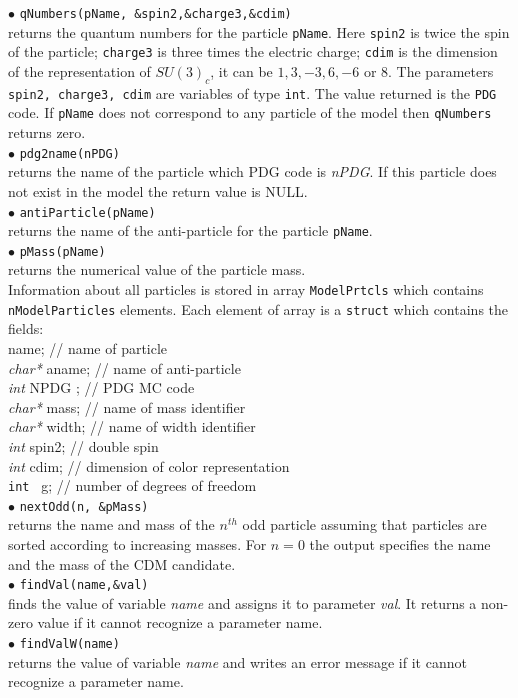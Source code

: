 \documentclass[12pt,a4paper]{article}
\begin{document}
%
\noindent 
$\bullet$ \verb|qNumbers(pName, &spin2,&charge3,&cdim)|\\
returns the quantum numbers for the particle \verb|pName|. Here \verb|spin2| is twice the spin of the particle; \verb|charge3| is 
three times the electric charge; \verb|cdim| is the  dimension of the representation
of $SU(3)_c$, it can be $1,3,-3,6,-6$ or $8$. The parameters {\tt spin2, charge3, cdim} are 
variables of type {\tt int}. The value returned 
is the {\tt PDG} code. If \verb|pName| does not correspond to any
particle of the model then \verb|qNumbers| returns zero.\\[2mm]
%
$\bullet$  \verb|pdg2name(nPDG)| \\
returns  the name of  the particle which PDG code is {\it nPDG}. If this particle does not exist in the model
the return value is NULL.\\[2mm]
%
$\bullet$  \verb|antiParticle(pName)| \\
returns  the name of the anti-particle for the particle \verb|pName|.\\[2mm]
%
$\bullet$  \verb|pMass(pName)| \\
returns  the numerical value of the particle mass.\\[2mm]
Information about all particles is stored in array {\tt ModelPrtcls} which contains {\tt nModelParticles}  elements.
Each element of array is a {\tt struct} which contains the fields: \\
\hspace{1cm}{\it char*} name; // name of particle\\
{\it char*} aname; // name of anti-particle\\
{\it int } NPDG ; // PDG MC code\\
{ \it char*} mass; // name of mass   identifier \\
{\it  char*}  width; // name of width identifier \\
{\it int }  spin2; // double spin \\
{\it int }  cdim;   // dimension of color representation \\ 
{\tt int } g; // number of degrees of freedom  \\


\noindent
$\bullet$  \verb|nextOdd(n, &pMass)| \\
returns the name and mass of the $n^{th}$ odd particle assuming that particles are 
sorted according to increasing masses. For $n=0$ the output specifies the 
name and the mass of the CDM candidate. \\[2mm]
%
$\bullet$ \verb|findVal(name,&val)|\\
 finds the  value of
 variable  {\it name} and assigns it to parameter {\it val}. It returns a non-zero
value  if it cannot recognize  a parameter name.\\[2mm]
%
$\bullet$ \verb|findValW(name)| \\
returns the value of variable {\it name} and writes an error message
if it cannot recognize  a parameter name.\\[2mm]
\end{document}
